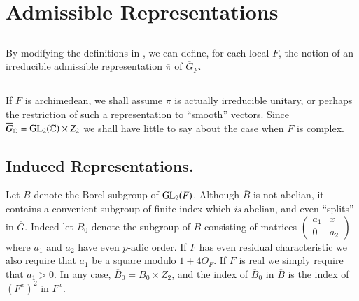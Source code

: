 \section{Admissible Representations}\label{art1-sec2}

\subsection{}\label{art1-sec2.1}
By modifying the definitions in \cite{Jacquet-Langlands}, we can define, for each local $F$, the notion of an irreducible admissible representation $\overline{\pi}$ of $\overline{G}_{F}$.

\subsection{}\label{art1-sec2.2}
If $F$ is archimedean, we shall assume $\pi$ is actually irreducible unitary, or perhaps the restriction of such a representation to ``smooth'' vectors. Since $\overline{G}_{\mathbb{C}}=\mathrm{GL}_{2}(\mathbb{C})\times Z_{2}$ we shall have little to say about the case when $F$ is complex.

\subsection{Induced Representations.}\label{art1-sec2.3}
Let $B$ denote the Borel subgroup of $\mathrm{GL}_{2}(F)$. Although $\overline{B}$ is not abelian, it contains a convenient subgroup of finite index which {\em is} abelian, and even ``splits'' in $\overline{G}$. Indeed let $B_{0}$ denote the subgroup of $B$ consisting of matrices $\left(\begin{smallmatrix} a_{1} & x\\ 0 & a_{2}\end{smallmatrix}\right)$ where $a_{1}$ and $a_{2}$ have even $p$-adic order. If $F$ has even residual characteristic we also require that $a_{1}$ be a square modulo $1+4O_{F}$. If $F$ is real we simply require that $a_{1}>0$. In any case, $\overline{B}_{0}=B_{0}\times Z_{2}$, and the index of $\overline{B}_{0}$ in $\overline{B}$ is the index of $(F^{x})^{2}$ in $F^{x}$.


